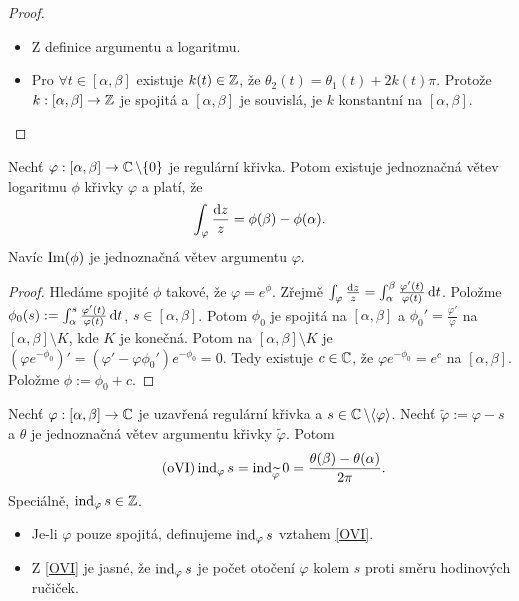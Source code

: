 \begin{proof}
\mbox{}
\begin{itemize}
    \item Z definice argumentu a logaritmu.
    \item Pro $\forall t \in [\alpha, \beta]$ existuje $k (t) \in \operatorname{\mathbb{Z}}$, že $\theta_2(t)=\theta_1(t) + 2 k(t) \pi$. Protože $k:  [\alpha, \beta] \rightarrow \operatorname{\mathbb{Z}}$ je spojitá a $[\alpha, \beta]$ je souvislá, je $k$ konstantní na $[\alpha, \beta]$.
\end{itemize}
\end{proof}

\begin{theorem}
Nechť $\varphi: [\alpha, \beta] \rightarrow \operatorname{\mathbb{C}}  \setminus \{0\}$ je regulární křivka. Potom existuje jednoznačná větev logaritmu $\phi$ křivky $\varphi$ a platí, že
$$
\int_\varphi \frac{\mathop{}\!\mathrm{d} z}{z}=\phi(\beta) - \phi(\alpha) \text{.}
$$
Navíc $\operatorname{Im}(\phi)$ je jednoznačná větev argumentu $\varphi$.
\end{theorem}
\begin{proof}
Hledáme spojité $\phi$ takové, že $\varphi=e^\phi$. Zřejmě $\int_\varphi \frac{\mathop{}\!\mathrm{d} z}{z}=\int_\alpha^\beta \frac{\varphi'(t)}{\varphi(t)} \mathop{}\!\mathrm{d} t$. Položme $\phi_0(s):=\int_\alpha^s \frac{\varphi'(t)}{\varphi(t)} \mathop{}\!\mathrm{d} t$, $s \in [\alpha, \beta]$. Potom $\phi_0$ je spojitá na $[\alpha, \beta]$ a $\phi_0'=\frac{\varphi'}{\varphi}$ na $[\alpha, \beta] \setminus K$, kde $K$ je konečná. Potom na $[\alpha, \beta] \setminus K$ je $(\varphi e^{-\phi_0})'=(\varphi' - \varphi \phi_0') e^{-\phi_0}=0$. Tedy existuje $c \in \operatorname{\mathbb{C}} $, že $\varphi e^{-\phi_0}=e^c$ na $[\alpha, \beta]$. Položme $\phi:=\phi_0+c$.
\end{proof}

\begin{theorem}
Nechť $\varphi: [\alpha, \beta] \rightarrow \operatorname{\mathbb{C}} $ je uzavřená regulární křivka a $s \in \operatorname{\mathbb{C}} \setminus \langle \varphi \rangle$. Nechť $\widetilde{\varphi}:=\varphi-s$ a $\theta$ je jednoznačná větev argumentu křivky $\widetilde{\varphi}$. Potom
\begin{equation}\tag{oVI}\label{OVI}
    \operatorname{ind}_\varphi s= \operatorname{ind}_{\widetilde{\varphi}}0=\frac{\theta(\beta)-\theta(\alpha)}{2 \pi}\text{.}
\end{equation}
Speciálně, $\operatorname{ind}_\varphi s \in \operatorname{\mathbb{Z}}$.
\end{theorem}

\begin{note*}
\mbox{}
\begin{itemize}
    \item Je-li $\varphi$ pouze spojitá, definujeme $\operatorname{ind}_\varphi s$ vztahem \cref{OVI}.
    \item Z \cref{OVI} je jasné, že $\operatorname{ind}_\varphi s$ je počet otočení $\varphi$ kolem $s$ proti směru hodinových ručiček.
\end{itemize}
\end{note*}

